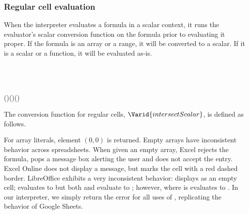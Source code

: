 \subsubsection{Regular cell evaluation}
\label{regularcells}

When the interpreter evaluates a formula in a scalar context, it runs the
evaluator's scalar conversion function on the formula prior to evaluating it
proper. If the formula is an array or a range, it will be converted to a
scalar. If it is a scalar or a function, it will be evaluated as-is.

\begin{hscode}\SaveRestoreHook
{}%
%
%
%
\>[B]{}\;\;\;\mathrel{=}{}\<[E]%
\\
\>[B]{}\<[4]%
\>[4]{}\;\;\;\<[E]%
\\
\>[B]{}\<[4]%
\>[4]{}\<[E]%
\\
\>[4]{}\<[7]%
\>[7]{}\mathrel{=}(\;)\;(\;)\;(\;)\;\<[E]%
\ColumnHook
\end{hscode}\resethooks

The conversion function for regular cells, \ensuremath{\Varid{intersectScalar}}, is defined as
follows.

For array literals, element $(0, 0)$ is returned. Empty arrays have
inconsistent behavior across spreadsheets. When given an empty array, Excel
rejects the formula, pops a message box alerting the user and does not accept
the entry. Excel Online does not display a message, but marks the cell with a
red dashed border. LibreOffice exhibits a very inconsistent behavior: 
displays as an empty cell;  evaluates to  but both 
and  evaluate to ; however,  where  is 
evaluates to . In our interpreter, we simply return the 
error for all uses of , replicating the behavior of Google Sheets. 

